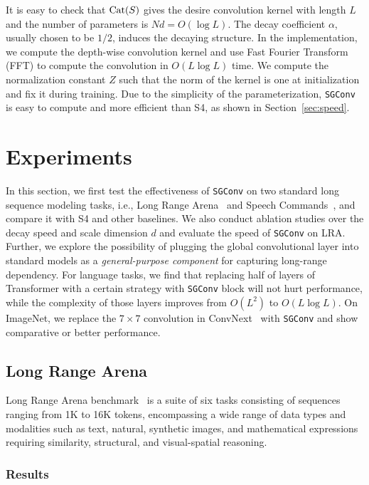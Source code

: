 It is easy to check that $\textnormal{Cat}(S)$ gives the desire convolution kernel with length $L$ and the number of parameters is $Nd=O(\log L)$. The decay coefficient $\alpha$, usually chosen to be $1/2$, induces the decaying structure. In the implementation, we compute the depth-wise convolution kernel and use Fast Fourier Transform (FFT) to compute the convolution in $O(L\log L)$ time. We compute the normalization constant $Z$ such that the norm of the kernel is one at initialization and fix it during training. Due to the simplicity of the parameterization, \texttt{SGConv} is easy to compute and more efficient than S4, as shown in Section~\ref{sec:speed}.

\section{Experiments}

In this section, we first test the effectiveness of \texttt{SGConv} on two standard long sequence modeling tasks, i.e., Long Range Arena~\citep{tay2020long} and Speech Commands~\citep{warden2018speech}, and compare it with S4 and other baselines. We also conduct ablation studies over the decay speed and scale dimension $d$ and evaluate the speed of \texttt{SGConv} on LRA. Further, we explore the possibility of plugging the global convolutional layer into standard models as a \emph{general-purpose component} for capturing long-range dependency. For language tasks, we find that replacing half of layers of Transformer with a certain strategy with \texttt{SGConv} block will not hurt performance, while the complexity of those layers improves from $O(L^2)$ to $O(L\log L)$. On ImageNet, we replace the $7\times 7$ convolution in ConvNext~\citep{liu2022convnet} with \texttt{SGConv} and show comparative or better performance.

\subsection{Long Range Arena}

Long Range Arena benchmark~\citep{tay2020long} is a suite of six tasks consisting of sequences ranging from 1K to 16K tokens, encompassing a wide range of data types and modalities such as text, natural, synthetic images, and mathematical expressions requiring similarity, structural, and visual-spatial reasoning.
\subsubsection{Results}

